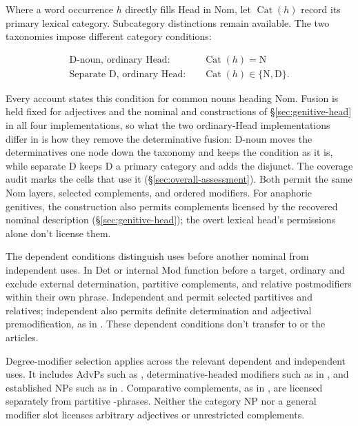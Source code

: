 \documentclass[12pt]{article}
\begin{document}
Where a word occurrence $h$ directly fills Head in Nom, let $\operatorname{Cat}(h)$ record its primary lexical category. Subcategory distinctions remain available. The two taxonomies impose different category conditions:

\[
\begin{aligned}
\text{D-noun, ordinary Head:} &\quad \operatorname{Cat}(h)=\mathrm{N} \\
\text{Separate D, ordinary Head:} &\quad \operatorname{Cat}(h)\in\{\mathrm{N},\mathrm{D}\}.
\end{aligned}
\]

Every account states this condition for common nouns heading Nom. Fusion is held fixed for adjectives and the nominal  and  constructions of §\ref{sec:genitive-head} in all four implementations, so what the two ordinary-Head implementations differ in is how they remove the determinative fusion: D-noun moves the determinatives one node down the taxonomy and keeps the condition as it is, while separate D keeps D a primary category and adds the disjunct. The coverage audit marks the cells that use it (§\ref{sec:overall-assessment}). Both permit the same Nom layers, selected complements, and ordered modifiers. For anaphoric genitives, the construction also permits complements licensed by the recovered nominal description (§\ref{sec:genitive-head}); the overt lexical head's permissions alone don't license them.

The dependent conditions distinguish uses before another nominal from independent uses. In Det or internal Mod function before a target, ordinary  and  exclude external determination, partitive complements, and relative postmodifiers within their own phrase. Independent  and  permit selected partitives and relatives; independent  also permits definite determination and adjectival premodification, as in . These dependent conditions don't transfer to  or the articles.

Degree-modifier selection applies across the relevant dependent and independent uses. It includes AdvPs such as , determinative-headed modifiers such as  in , and established NPs such as  in . Comparative complements, as in , are licensed separately from partitive -phrases. Neither the category NP nor a general modifier slot licenses arbitrary adjectives or unrestricted complements.
\end{document}

